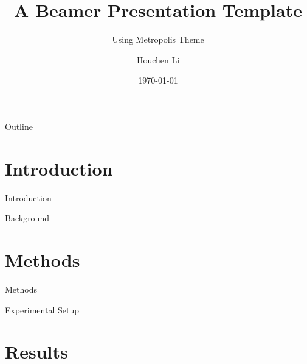 \documentclass[10pt,aspectratio=169]{beamer}
\title{A Beamer Presentation Template}
\subtitle{Using Metropolis Theme}
\author{Houchen Li}
\institute{Philipps-Universit\"at Marburg}
\date{\today}
\begin{document}
\maketitle


\begin{frame}{Outline}
\tableofcontents
\end{frame}


\section{Introduction}

\begin{frame}{Introduction}
\lipsum[1][1-5]
\end{frame}

\begin{frame}{Background}
\lipsum[2][1-5]
\end{frame}


\section{Methods}

\begin{frame}{Methods}
\lipsum[3][1-5]
\end{frame}

\begin{frame}{Experimental Setup}
\lipsum[4][1-5]
\end{frame}


\section{Results}
\end{document}
